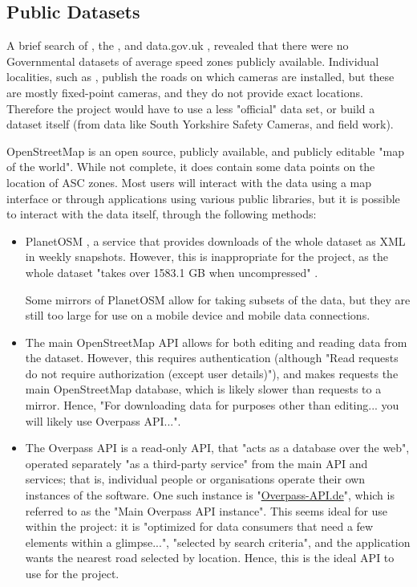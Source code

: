 \documentclass[11pt, a4paper, notitlepage]{report}
\begin{document}
\subsection{Public Datasets}
A brief search of \citet{OrdananceSurvey}, the \citet{ONSHome}, and data.gov.uk \citep{dataGovUK}, revealed that there were no Governmental datasets of average speed zones publicly available. Individual localities, such as \citet{sySpeedCamera}, publish the roads on which cameras are installed, but these are mostly fixed-point cameras, and they do not provide exact locations. Therefore the project would have to use a less "official" data set, or build a dataset itself (from data like South Yorkshire Safety Cameras, and field work).

OpenStreetMap \citep{OpenStreetMap} is an open source, publicly available, and publicly editable "map of the world". While not complete, it does contain some data points on the location of ASC zones. Most users will interact with the data using a map interface or through applications using various public libraries, but it is possible to interact with the data itself, through the following methods:
\begin{itemize}
	\item PlanetOSM \citep{planetOSM}, a service that provides downloads of the whole dataset as XML in weekly snapshots. However, this is inappropriate for the project, as the whole dataset "takes over 1583.1 GB when uncompressed" \citep{planetOSMwiki}.
	
	Some mirrors of PlanetOSM allow for taking subsets of the data, but they are still too large for use on a mobile device and mobile data connections.
	
	\item The main OpenStreetMap API \citep{OSMAPIv6} allows for both editing and reading data from the dataset. However, this requires authentication (although "Read requests do not require authorization (except user details)"), and makes requests the main OpenStreetMap database, which is likely slower than requests to a mirror. Hence, "For downloading data for purposes other than editing... you will likely use Overpass API...".
	
	\item The Overpass API \citep{overpassWiki} is a read-only API, that "acts as a database over the web", operated separately "as a third-party service" from the main API and services; that is, individual people or organisations operate their own instances of the software. One such instance is "\href{https://overpass-api.de/}{Overpass-API.de}", which is referred to as the "Main Overpass API instance". This seems ideal for use within the project: it is "optimized for data consumers that need a few elements within a glimpse...", "selected by search criteria", and the application wants the nearest road selected by location. Hence, this is the ideal API to use for the project.
\end{itemize}
\end{document}
